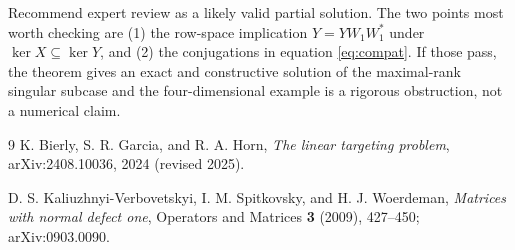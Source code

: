\documentclass[11pt]{article}
\begin{document}
Recommend expert review as a likely valid partial solution.  The two points
most worth checking are (1) the row-space implication
$Y=YW_1W_1^*$ under $\ker X\subseteq\ker Y$, and (2) the conjugations in
equation \eqref{eq:compat}.  If those pass, the theorem gives an exact and
constructive solution of the maximal-rank singular subcase and the
four-dimensional example is a rigorous obstruction, not a numerical claim.

\enlargethispage{3\baselineskip}
\small
\begin{thebibliography}{9}
K. Bierly, S. R. Garcia, and R. A. Horn,
\emph{The linear targeting problem}, arXiv:2408.10036, 2024 (revised 2025).

D. S. Kaliuzhnyi-Verbovetskyi, I. M. Spitkovsky, and H. J. Woerdeman,
\emph{Matrices with normal defect one}, Operators and Matrices
\textbf{3} (2009), 427--450; arXiv:0903.0090.
\end{thebibliography}
\end{document}
